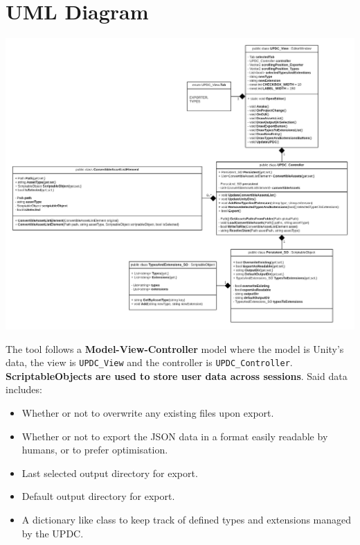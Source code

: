 \documentclass[12pt,a4paper]{article}
\begin{document}
\section{UML Diagram}
\begin{center}
\includegraphics[scale=0.25]{UMLUPDC}
\end{center}
\noindent The tool follows a \textbf{Model-View-Controller} model where the model is Unity's data, the view is \texttt{UPDC\_View} and the controller is \texttt{UPDC\_Controller}.\\
\textbf{ScriptableObjects are used to store user data across sessions}. Said data includes:
\begin{itemize}
\item Whether or not to overwrite any existing files upon export.
\item Whether or not to export the JSON data in a format easily readable by humans, or to prefer optimisation.
\item Last selected output directory for export.
\item Default output directory for export.
\item A dictionary like class to keep track of defined types and extensions managed by the UPDC.
\end{itemize}
\newpage
\end{document}
